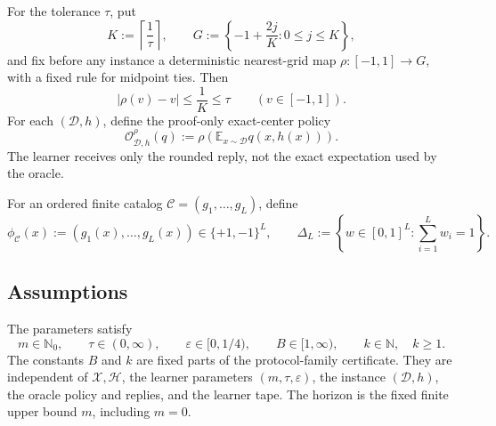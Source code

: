 For the tolerance \(\tau\), put
\begin{equation}
K:=\left\lceil\frac{1}{\tau}\right\rceil,
\qquad
G:=\left\{-1+\frac{2j}{K}:0\le j\le K\right\},
\label{eq:rounding-grid}
\end{equation}
and fix before any instance a deterministic nearest-grid map
\(\rho:[-1,1]\to G\), with a fixed rule for midpoint ties.  Then
\begin{equation}
|\rho(v)-v|\le\frac{1}{K}\le\tau
\qquad (v\in[-1,1]).
\label{eq:rounding-radius}
\end{equation}
For each \((\mathcal D,h)\), define the proof-only exact-center policy
\begin{equation}
\mathcal O^{\rho}_{\mathcal D,h}(q)
:=\rho\!\left(\mathbb E_{x\sim\mathcal D}q(x,h(x))\right).
\label{eq:canonical-policy}
\end{equation}
The learner receives only the rounded reply, not the exact expectation used
by the oracle.

For an ordered finite catalog \(\mathcal C=(g_1,\ldots,g_L)\), define
\begin{equation}
\phi_{\mathcal C}(x):=(g_1(x),\ldots,g_L(x))\in\{+1,-1\}^L,
\qquad
\Delta_L:=\left\{w\in[0,1]^L:\sum_{i=1}^Lw_i=1\right\}.
\label{eq:catalog-map-simplex}
\end{equation}

\subsection{Assumptions}

\begin{assumption}
\label{assump:sq-parameter-regime}
The parameters satisfy
\[
m\in\mathbb N_0,
\qquad \tau\in(0,\infty),
\qquad \varepsilon\in[0,1/4),
\qquad B\in[1,\infty),
\qquad k\in\mathbb N,\quad k\ge1.
\]
The constants \(B\) and \(k\) are fixed parts of the protocol-family
certificate.  They are independent of \(\mathcal X,\mathcal H\), the learner
parameters \((m,\tau,\varepsilon)\), the instance \((\mathcal D,h)\), the
oracle policy and replies, and the learner tape.  The horizon is the fixed
finite upper bound \(m\), including \(m=0\).
\end{assumption}


